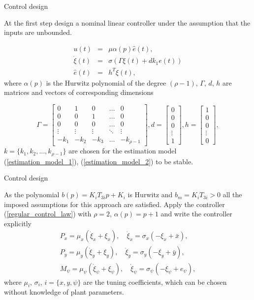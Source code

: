 \documentclass[10pt,pdf,hyperref={unicode}]{beamer}
\begin{document}
\begin{frame}{Control design}

At the first step design a nominal linear controller under the assumption that the inputs are unbounded.

\begin{eqnarray}
\label{regular_control_law}
u(t)&=&\mu\alpha(p)\hat e(t),\\
\label{estimation_model_1}
\dot\xi(t)&=&\sigma(\Gamma\xi(t)+dk_1e(t))\\
\label{estimation_model_2}
\hat e(t)&=&h^T\xi(t),
\end{eqnarray}
where $\alpha(p)$ is the Hurwitz polynomial of the degree $(\rho-1)$, $\Gamma$, $d$, $h$ are matrices and vectors of corresponding dimensions

\begin{equation}
\Gamma=
\begin{bmatrix}
0 & 1 & 0 & \ldots & 0\\
0 & 0 & 1 & \ldots & 0\\
0 & 0 & 0 & \ldots & 0\\
\vdots & \vdots & \vdots & \ddots & \vdots\\
-k_1 & -k_2 & -k_3 & \ldots & -k_{\rho-1}
\end{bmatrix}\!,
d=
\begin{bmatrix}
0\\
0\\
0\\
\vdots\\
1
\end{bmatrix}\!,
h=
\begin{bmatrix}
1\\
0\\
0\\
\vdots\\
0
\end{bmatrix}\!,
\end{equation}
$k=\{k_1,k_2,\ldots,k_{\rho-1}\}$ are chosen for the estimation model (\ref{estimation_model_1}), (\ref{estimation_model_2}) to be stable.

\end{frame}

\begin{frame}{Control design}

As the polynomial $b(p)=K_iT_{3i}p+K_i$ is Hurwitz and $b_m=K_iT_{3i}>0$ all the imposed assumptions for this approach are satisfied. Apply the controller (\ref{regular_control_law}) with $\rho=2$, $\alpha(p)=p+1$ and write the controller explicitly
\begin{eqnarray}
&P_x=\mu_x(\dot\xi_x+\xi_x),\quad\dot\xi_x=\sigma_x(-\xi_x+\bar x),&\\
&P_y=\mu_y(\dot\xi_y+\xi_y),\quad\dot\xi_y=\sigma_y(-\xi_y+\bar y),&\\
&M_\psi=\mu_\psi(\dot\xi_\psi+\xi_\psi),\quad\dot\xi_\psi=\sigma_\psi(-\xi_\psi+e_\psi),&
\end{eqnarray} 
where $\mu_i$, $\sigma_i$, $i=\{x,y,\psi\}$ are the tuning coefficients, which can be chosen without knowledge of plant parameters.

\end{frame}
\end{document}
